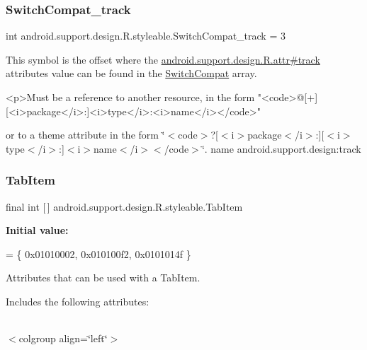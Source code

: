 \subsubsection{\texorpdfstring{Switch\+Compat\+\_\+track}{SwitchCompat\_track}}
{\footnotesize\ttfamily int android.\+support.\+design.\+R.\+styleable.\+Switch\+Compat\+\_\+track = 3\hspace{0.3cm}{\ttfamily [static]}}

This symbol is the offset where the \hyperlink{classandroid_1_1support_1_1design_1_1R_1_1attr_ad467d29a4423787673806b6d2ec0a48e}{android.\+support.\+design.\+R.\+attr\#track} attribute\textquotesingle{}s value can be found in the \hyperlink{classandroid_1_1support_1_1design_1_1R_1_1styleable_a7389a923bf3e321b6b5d10b0589547a1}{Switch\+Compat} array.

\begin{DoxyVerb}      <p>Must be a reference to another resource, in the form "<code>@[+][<i>package</i>:]<i>type</i>:<i>name</i></code>"
\end{DoxyVerb}
 or to a theme attribute in the form \char`\"{}$<$code$>$?\mbox{[}$<$i$>$package$<$/i$>$\+:\mbox{]}\mbox{[}$<$i$>$type$<$/i$>$\+:\mbox{]}$<$i$>$name$<$/i$>$$<$/code$>$\char`\"{}.  name android.\+support.\+design\+:track \mbox{\label{classandroid_1_1support_1_1design_1_1R_1_1styleable_a244f187ed8d4ed589f36e6db741d19e8}} 
\subsubsection{\texorpdfstring{Tab\+Item}{TabItem}}
{\footnotesize\ttfamily final int \mbox{[}$\,$\mbox{]} android.\+support.\+design.\+R.\+styleable.\+Tab\+Item\hspace{0.3cm}{\ttfamily [static]}}

{\bfseries Initial value\+:}
\begin{DoxyCode}
= \{
            0x01010002, 0x010100f2, 0x0101014f
        \}
\end{DoxyCode}
Attributes that can be used with a Tab\+Item. 

Includes the following attributes\+:

\tabulinesep=1mm
\begin{longtabu} spread 0pt [c]{*{0}{|X[-1]}|}
\hline
\end{longtabu}
$<$colgroup align=\char`\"{}left\char`\"{}$>$ 

